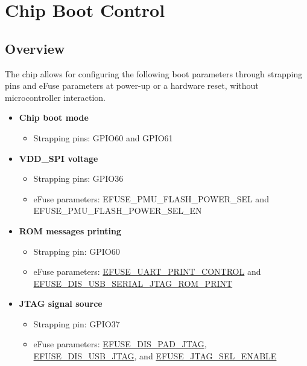 \documentclass[main\_\_EN.tex]{subfiles}
\begin{document}
\setenglishformatting

\ifglobal
\else
    \clearpage
    \listoftodos
    \listofdonetodos
    \tableofcontents
\fi



\hypertarget{bootctrl}{}
\chapter{Chip Boot Control}
\label{mod:bootctrl}


\section{Overview}
\label{sec:bootctrl-overview}

The chip allows for configuring the following boot parameters through strapping pins and eFuse parameters at power-up or a hardware reset, without microcontroller interaction.

\begin{itemize}
    \item \textbf{Chip boot mode}
    \begin{itemize}
        \item Strapping pins: GPIO60 and GPIO61
    \end{itemize}
    
    \item \textbf{VDD\_SPI voltage}
    \begin{itemize}
        \item Strapping pins: GPIO36
        \item eFuse parameters: EFUSE\_PMU\_FLASH\_POWER\_SEL and EFUSE\_PMU\_FLASH\_POWER\_SEL\_EN
    \end{itemize}

    \item \textbf{ROM messages printing}
    \begin{itemize}
        \item Strapping pin: GPIO60
        \item eFuse parameters: \hyperref[fielddesc:EFUSEUARTPRINTCONTROL]{EFUSE\_UART\_PRINT\_CONTROL} and \hyperref[fielddesc:EFUSEDISUSBSERIALJTAGROMPRINT]{EFUSE\_DIS\_USB\_SERIAL\_JTAG\_ROM\_PRINT}
    \end{itemize}
    
    \item \textbf{JTAG signal source}
    \begin{itemize}
        \item Strapping pin: GPIO37
        \item eFuse parameters: \hyperref[fielddesc:EFUSEDISPADJTAG]{EFUSE\_DIS\_PAD\_JTAG}, \hyperref[fielddesc:EFUSEDISUSBJTAG]{EFUSE\_DIS\_USB\_JTAG}, and \hyperref[fielddesc:EFUSEJTAGSELENABLE]{EFUSE\_JTAG\_SEL\_ENABLE}
    \end{itemize}
\end{itemize}
\end{document}
